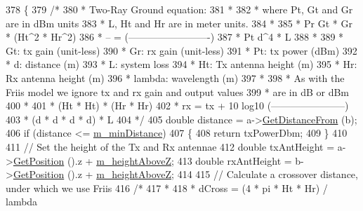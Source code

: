 \begin{DoxyCode}
378 \{
379   \textcolor{comment}{/*}
380 \textcolor{comment}{   * Two-Ray Ground equation:}
381 \textcolor{comment}{   *}
382 \textcolor{comment}{   * where Pt, Gt and Gr are in dBm units}
383 \textcolor{comment}{   * L, Ht and Hr are in meter units.}
384 \textcolor{comment}{   *}
385 \textcolor{comment}{   *   Pr      Gt * Gr * (Ht^2 * Hr^2)}
386 \textcolor{comment}{   *   -- =  (-------------------------)}
387 \textcolor{comment}{   *   Pt            d^4 * L}
388 \textcolor{comment}{   *}
389 \textcolor{comment}{   * Gt: tx gain (unit-less)}
390 \textcolor{comment}{   * Gr: rx gain (unit-less)}
391 \textcolor{comment}{   * Pt: tx power (dBm)}
392 \textcolor{comment}{   * d: distance (m)}
393 \textcolor{comment}{   * L: system loss}
394 \textcolor{comment}{   * Ht: Tx antenna height (m)}
395 \textcolor{comment}{   * Hr: Rx antenna height (m)}
396 \textcolor{comment}{   * lambda: wavelength (m)}
397 \textcolor{comment}{   *}
398 \textcolor{comment}{   * As with the Friis model we ignore tx and rx gain and output values}
399 \textcolor{comment}{   * are in dB or dBm}
400 \textcolor{comment}{   *}
401 \textcolor{comment}{   *                      (Ht * Ht) * (Hr * Hr)}
402 \textcolor{comment}{   * rx = tx + 10 log10 (-----------------------)}
403 \textcolor{comment}{   *                      (d * d * d * d) * L}
404 \textcolor{comment}{   */}
405   \textcolor{keywordtype}{double} distance = a->\hyperlink{classns3_1_1MobilityModel_afa16c20b3c5fd135be075000f0272f31}{GetDistanceFrom} (b);
406   \textcolor{keywordflow}{if} (distance <= \hyperlink{classns3_1_1TwoRayGroundPropagationLossModel_a2afd2fcfb186242e2fe2d6ef85240498}{m\_minDistance})
407     \{
408       \textcolor{keywordflow}{return} txPowerDbm;
409     \}
410 
411   \textcolor{comment}{// Set the height of the Tx and Rx antennae}
412   \textcolor{keywordtype}{double} txAntHeight = a->\hyperlink{classns3_1_1MobilityModel_aba838f06ec5bbb2d193d94b8c0e4abb4}{GetPosition} ().z + \hyperlink{classns3_1_1TwoRayGroundPropagationLossModel_a3b383aac3f7bf082f1bb15ca6b1efd3f}{m\_heightAboveZ};
413   \textcolor{keywordtype}{double} rxAntHeight = b->\hyperlink{classns3_1_1MobilityModel_aba838f06ec5bbb2d193d94b8c0e4abb4}{GetPosition} ().z + \hyperlink{classns3_1_1TwoRayGroundPropagationLossModel_a3b383aac3f7bf082f1bb15ca6b1efd3f}{m\_heightAboveZ};
414 
415   \textcolor{comment}{// Calculate a crossover distance, under which we use Friis}
416   \textcolor{comment}{/*}
417 \textcolor{comment}{   * }
418 \textcolor{comment}{   * dCross = (4 * pi * Ht * Hr) / lambda}

\end{DoxyCode}
